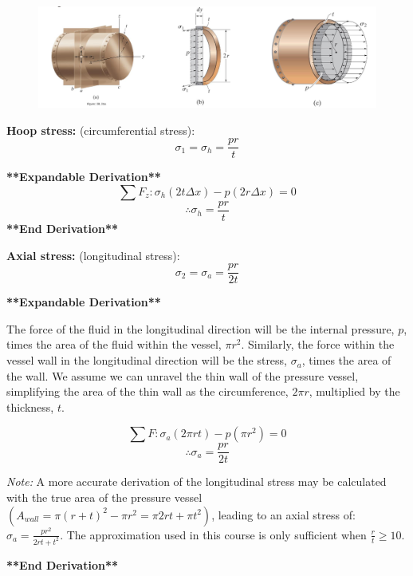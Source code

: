 \begin{figure}[!h]
\centering
\includegraphics[angle=0, width=6in]{Pressure Vessels-Figures/CylindricalVessel.png}
\vspace{-2mm}
\caption{\small {}}
\vspace{-3mm}
\label{Fig:CylindricalVessel}
\end{figure}

\noindent \textbf{Hoop stress:} (circumferential stress): \[\sigma_1 = \sigma_h = \frac{pr}{t}\]

\noindent \textbf{**Expandable Derivation**}
\[\sum F_z: \sigma_h (2t \Delta x) - p(2r \Delta x)=0\]
\[\therefore \sigma_h = \frac{pr}{t}\]
\noindent \textbf{**End Derivation**}

\noindent \textbf{Axial stress:} (longitudinal stress): \[\sigma_2 = \sigma_a = \frac{pr}{2t}\]

\noindent \textbf{**Expandable Derivation**}

\noindent The force of the fluid in the longitudinal direction will be the internal pressure, $p$, times the area of the fluid within the vessel, $\pi r^2$. Similarly, the force within the vessel wall in the longitudinal direction will be the stress, $\sigma_a$, times the area of the wall. We assume we can unravel the thin wall of the pressure vessel, simplifying the area of the thin wall as the circumference, $2\pi r$, multiplied by the thickness, $t$.

\[\sum F: \sigma_a (2\pi r t) - p(\pi r^2)=0\]
\[\therefore \sigma_a = \frac{pr}{2t}\]

\noindent \textit{Note:} A more accurate derivation of the longitudinal stress may be calculated with the true area of the pressure vessel $(A_{wall} = \pi(r+t)^2 - \pi r^2 = \pi 2rt + \pi t^2)$, leading to an axial stress of: $\sigma_a = \frac{pr^2}{2rt + t^2}$. The approximation used in this course is only sufficient when $\frac{r}{t} \ge 10$. 

\vspace{5pt}

\noindent \textbf{**End Derivation**}


